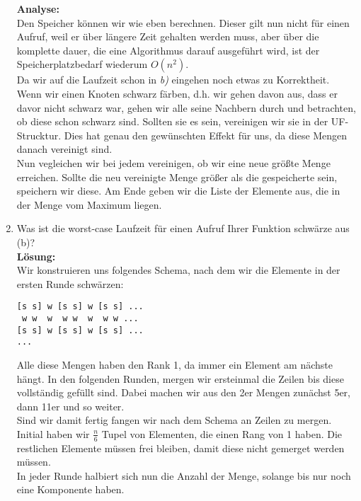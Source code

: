 \documentclass[11pt,a4paper,ngerman]{article}
\begin{document}
\begin{enumerate}[\bfseries (a)]
\textbf{Analyse:}\\
Den Speicher können wir wie eben berechnen. Dieser gilt nun nicht für einen Aufruf, weil er über längere Zeit gehalten werden muss, aber über die komplette dauer, die eine Algorithmus darauf ausgeführt wird, ist der Speicherplatzbedarf wiederum $O(n^2)$.\\

Da wir auf die Laufzeit schon in \emph{b)} eingehen noch etwas zu Korrektheit.\\

Wenn wir einen Knoten schwarz färben, d.h. wir gehen davon aus, dass er davor nicht schwarz war, gehen wir alle seine Nachbern durch und betrachten, ob diese schon schwarz sind. Sollten sie es sein, vereinigen wir sie in der UF-Strucktur. Dies hat genau den gewünschten Effekt für uns, da diese Mengen danach vereinigt sind.\\
Nun vegleichen wir bei jedem vereinigen, ob wir eine neue größte Menge erreichen. Sollte die neu vereinigte Menge größer als die gespeicherte sein, speichern wir diese. Am Ende geben wir die Liste der Elemente aus, die in der Menge vom Maximum liegen.

\item Was ist die worst-case Laufzeit für einen Aufruf Ihrer Funktion schwärze aus (b)?\\

\textbf{Lösung:}\\

Wir konstruieren uns folgendes Schema, nach dem wir die Elemente in der ersten Runde schwärzen:\\
\begin{lstlisting}
[s s] w [s s] w [s s] ...
 w w  w  w w  w  w w ...
[s s] w [s s] w [s s] ...
... 
\end{lstlisting}
Alle diese Mengen haben den Rank 1, da immer ein Element am nächste hängt. In den folgenden Runden, mergen wir ersteinmal die Zeilen bis diese vollständig gefüllt sind. Dabei machen wir aus den 2er Mengen zunächst 5er, dann 11er und so weiter.\\
Sind wir damit fertig fangen wir nach dem Schema an Zeilen zu mergen.\\

Initial haben wir $\frac{n}{6}$ Tupel von Elementen, die einen Rang von 1 haben. Die restlichen Elemente müssen frei bleiben, damit diese nicht gemerget werden müssen.\\
In jeder Runde halbiert sich nun die Anzahl der Menge, solange bis nur noch eine Komponente haben.\\


\end{enumerate}
\end{document}
